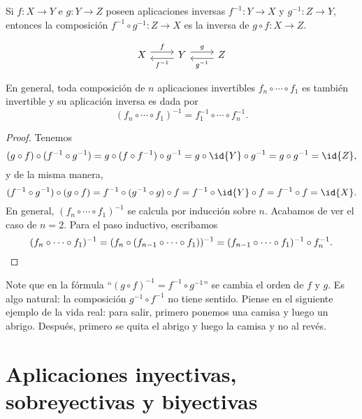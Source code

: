 \begin{observacion}
  \label{obs:aplicaciones-inversas-para-composiciones}
  Si $f\colon X\to Y$ e $g\colon Y \to Z$ poseen aplicaciones inversas
  $f^{-1}\colon Y\to X$ y $g^{-1}\colon Z\to Y$, entonces la composición
  $f^{-1}\circ g^{-1}\colon Z\to X$ es la inversa de $g\circ f\colon X\to Z$.

  \[ \begin{tikzcd}
      X \ar[shift left=.75ex]{r}{f} & Y \ar[shift left=.75ex]{r}{g}\ar[shift left=.75ex]{l}{f^{-1}} & Z\ar[shift left=.75ex]{l}{g^{-1}}
    \end{tikzcd} \]

  En general, toda composición de $n$ aplicaciones invertibles
  $f_n\circ \cdots\circ f_1$ es también invertible y su aplicación inversa es
  dada por
  $$(f_n\circ \cdots\circ f_1)^{-1} = f_1^{-1}\circ\cdots\circ f_n^{-1}.$$

  \begin{proof}
    Tenemos
    \[ (g\circ f)\circ (f^{-1}\circ g^{-1}) =
      g\circ (f\circ f^{-1})\circ g^{-1} =
      g\circ \id{Y}\circ g^{-1} =
      g\circ g^{-1} = \id{Z}, \]
    y de la misma manera,
    \[ (f^{-1}\circ g^{-1})\circ (g\circ f) =
      f^{-1}\circ (g^{-1}\circ g)\circ f =
      f^{-1}\circ \id{Y}\circ f =
      f^{-1}\circ f = \id{X}. \]
    En general, $(f_n\circ \cdots\circ f_1)^{-1}$ se calcula por inducción sobre
    $n$. Acabamos de ver el caso de $n = 2$. Para el paso inductivo, escribamos
    \[ (f_n\circ \cdots\circ f_1)^{-1} =
      (f_n\circ (f_{n-1}\circ\cdots\circ f_1))^{-1} =
      (f_{n-1}\circ\cdots\circ f_1)^{-1}\circ f_n^{-1}. \qedhere \]
  \end{proof}
\end{observacion}

Note que en la fórmula ``$(g\circ f)^{-1} = f^{-1}\circ g^{-1}$'' se cambia
el orden de $f$ y $g$. Es algo natural: la composición $g^{-1}\circ f^{-1}$
no tiene sentido. Piense en el siguiente ejemplo de la vida real: para salir,
primero ponemos una camisa y luego un abrigo. Después, primero se quita
el abrigo y luego la camisa y no al revés.


\section{Aplicaciones inyectivas, sobreyectivas y biyectivas}
\label{seccion:inyectivas-sobreyectivas-biyectivas}

